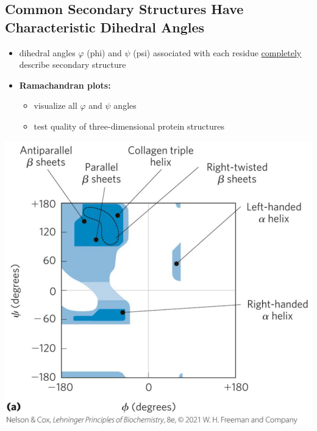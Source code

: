 \documentclass[10pt]{article}
\begin{document}
\subsection*{Common Secondary Structures Have Characteristic Dihedral Angles}
\begin{itemize}
    \item dihedral angles $\varphi$ (phi) and $\psi$ (psi) associated with each residue \underline{completely} describe secondary structure
    \item \textbf{Ramachandran plots:}
    \begin{itemize}
        \item visualize all $\varphi$ and $\psi$ angles
        \item test quality of three-dimensional protein structures
    \end{itemize}
\end{itemize}
\begin{center}
    \includegraphics*[scale=0.5]{L4_6.png}
\end{center}
\end{document}
